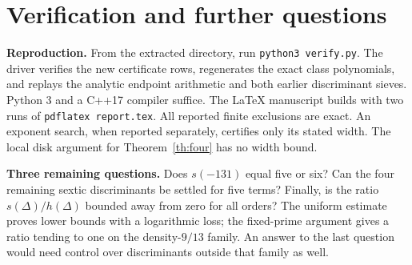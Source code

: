 \documentclass[11pt,letterpaper]{article}
\newcommand{\heading}[1]{\textbf{\color{ink}#1}}
\begin{document}
\section{Verification and further questions}
\heading{Reproduction.} From the extracted directory, run \texttt{python3 verify.py}. The driver verifies the new certificate rows, regenerates the exact class polynomials, and replays the analytic endpoint arithmetic and both earlier discriminant sieves. Python 3 and a C++17 compiler suffice. The LaTeX manuscript builds with two runs of \texttt{pdflatex report.tex}. All reported finite exclusions are exact. An exponent search, when reported separately, certifies only its stated width. The local disk argument for Theorem~\ref{th:four} has no width bound.

\heading{Three remaining questions.} Does $s(-131)$ equal five or six? Can the four remaining sextic discriminants be settled for five terms? Finally, is the ratio $s(\Delta)/h(\Delta)$ bounded away from zero for all orders? The uniform estimate proves lower bounds with a logarithmic loss; the fixed-prime argument gives a ratio tending to one on the density-$9/13$ family. An answer to the last question would need control over discriminants outside that family as well.
\end{document}
